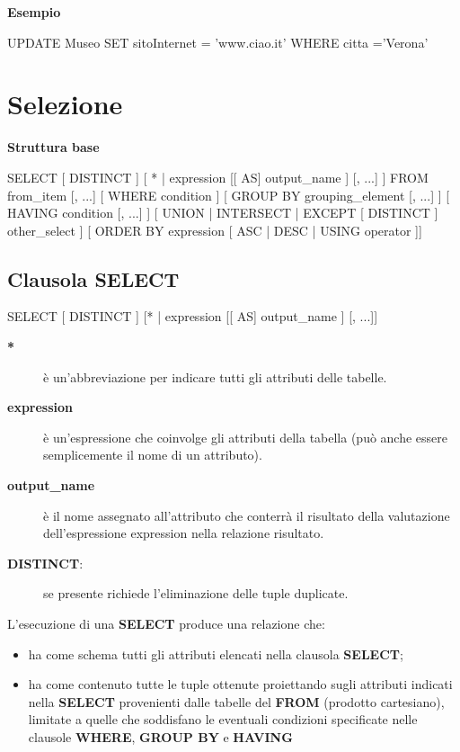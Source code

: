 \textbf{Esempio}
\begin{codiceSQL}
UPDATE Museo SET sitoInternet = 'www.ciao.it' WHERE citta ='Verona'  
\end{codiceSQL}


\section{Selezione}

\textbf{\large Struttura base}

\begin{codiceSQL}
SELECT [ DISTINCT ]
[ * | expression [[ AS] output_name ] [, 
...] ]
FROM from_item [, ...] 
[ WHERE condition ]
[ GROUP BY grouping_element [, ...] ]
[ HAVING condition [, ...] ]
[ { UNION | INTERSECT | EXCEPT } [ DISTINCT
] other_select ]
[ ORDER BY expression [ ASC | DESC | USING 
operator ]]

\end{codiceSQL}


\subsection{Clausola SELECT}
\begin{codiceSQL}
SELECT [ DISTINCT ]
[{* | expression [[ AS] output_name ]} [, ...]]
\end{codiceSQL}
\begin{description}
  \item [\textbf{*}] è un’abbreviazione per indicare tutti gli attributi delle tabelle.
  \item [\textbf{expression}] è un’espressione che coinvolge gli attributi della tabella (può anche essere semplicemente il nome di un attributo).
  \item [\textbf{output\_name}] è il nome assegnato all’attributo che conterrà il risultato della valutazione dell’espressione expression nella relazione risultato.
  \item [\textbf{DISTINCT}:] se presente richiede l’eliminazione delle tuple duplicate.

\end{description}


L’esecuzione di una \textbf{SELECT} produce una relazione che:
\begin{itemize}
  \item ha come schema tutti gli attributi elencati nella clausola \textbf{SELECT};
  \item ha come contenuto tutte le tuple ottenute proiettando sugli attributi 
indicati nella \textbf{SELECT} provenienti dalle tabelle del \textbf{FROM} (prodotto 
cartesiano), limitate a quelle che soddisfano le eventuali condizioni 
specificate nelle clausole \textbf{WHERE}, \textbf{GROUP BY} e \textbf{HAVING}
\end{itemize}



